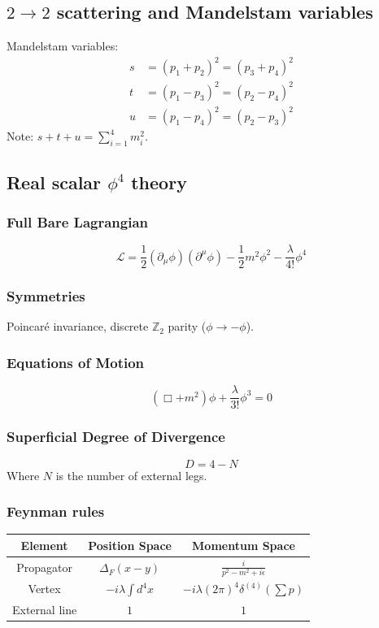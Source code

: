 \documentclass{article}
\begin{document}
\subsection{$2 \rightarrow 2$ scattering and Mandelstam variables}
Mandelstam variables:
\begin{align}
    s &= (p_1 + p_2)^2 = (p_3 + p_4)^2 \\
    t &= (p_1 - p_3)^2 = (p_2 - p_4)^2 \\
    u &= (p_1 - p_4)^2 = (p_2 - p_3)^2
\end{align}
Note: $s + t + u = \sum_{i=1}^4 m_i^2$.
\subsection{Real scalar $\phi^4$ theory}
\subsubsection*{Full Bare Lagrangian}
\begin{equation}
    \mathcal{L} = \frac{1}{2}(\partial_\mu \phi)(\partial^\mu \phi) - \frac{1}{2}m^2\phi^2 - \frac{\lambda}{4!}\phi^4
\end{equation}
\subsubsection*{Symmetries}
Poincar\'{e} invariance, discrete $\mathbb{Z}_2$ parity ($\phi \to -\phi$).
\subsubsection*{Equations of Motion}
\begin{equation}
    (\Box + m^2)\phi + \frac{\lambda}{3!}\phi^3 = 0
\end{equation}
\subsubsection*{Superficial Degree of Divergence}
\begin{equation}
    D = 4 - N
\end{equation}
Where $N$ is the number of external legs.
\subsubsection*{Feynman rules}
\begin{center}
\begin{tabular}{|c|c|c|}
\hline
\textbf{Element} & \textbf{Position Space} & \textbf{Momentum Space} \\ \hline
Propagator & $\Delta_F(x-y)$ & $\frac{i}{p^2 - m^2 + i\epsilon}$ \\ \hline
Vertex & $-i\lambda \int d^4x$ & $-i\lambda (2\pi)^4\delta^{(4)}(\sum p)$ \\ \hline
External line & $1$ & $1$ \\ \hline
\end{tabular}
\end{center}
\end{document}

